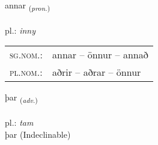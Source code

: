 \documentclass[frontgrid, backgrid]{flacards}\usepackage[]{graphicx}\usepackage[]{xcolor}
\begin{document}
\renewcommand{\blhead}{\vskip5pt {\small\bfseries\footnotesize Fornafn | Pronoun }}
\renewcommand{\bcfoot}{\vskip5pt \hspace{2pt}{\small\bfseries\footnotesize 1K}}


{annar \small{\textsubscript{(\textit{pron.})}} \\[1ex] %
\textphonetic{[anar]} \\
pl.: \emph{inny} \\  [2ex]
\renewcommand*{\arraystretch}{0.8}
\begin{tabular}{ll}
\textsc{sg.nom.}: & annar  --  önnur -- annað \\ 
\textsc{pl.nom.}: & aðrir -- aðrar -- önnur
\end{tabular}
}


\renewcommand{\flhead}{\vskip5pt \fboxsep=0pt {\small\bfseries\footnotesize Atviksorð | Adverb}}
\renewcommand{\fcfoot}{\vskip5pt \fboxsep=0pt \hspace{2pt}{\small\bfseries\footnotesize 1K}}

\renewcommand{\blhead}{\vskip5pt {\small\bfseries\footnotesize Atviksorð | Adverb }}
\renewcommand{\bcfoot}{\vskip5pt \hspace{2pt}{\small\bfseries\footnotesize 1K}}


{þar \small{\textsubscript{(\textit{adv.})}} \\[1ex]
\textphonetic{[θaːr]} \\
pl.: \emph{tam} \\  [2ex]
þar (Indeclinable)}


\renewcommand{\flhead}{\vskip5pt \fboxsep=0pt {\small\bfseries\footnotesize Forsetning | Preposition}}
\renewcommand{\fcfoot}{\vskip5pt \fboxsep=0pt \hspace{2pt}{\small\bfseries\footnotesize 1K}}

\renewcommand{\blhead}{\vskip5pt {\small\bfseries\footnotesize Forsetning | Preposition }}
\renewcommand{\bcfoot}{\vskip5pt \hspace{2pt}{\small\bfseries\footnotesize 1K}}
\end{document}
